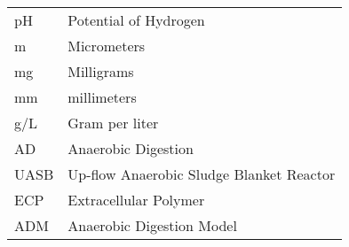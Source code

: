 %
%
%
%

\begin{acronyms}

\renewcommand{\arraystretch}{1.5}
\setlength{\tabcolsep}{3mm}
{\begin {tabular}{ll}
pH & Potential of Hydrogen\\

m &	Micrometers\\

mg & Milligrams\\

mm & millimeters\\

g/L & Gram per liter\\

AD & Anaerobic Digestion\\

UASB & Up-flow Anaerobic Sludge Blanket Reactor\\

ECP & Extracellular Polymer\\

ADM	& Anaerobic Digestion Model\\

\end {tabular}}

\end{acronyms}
